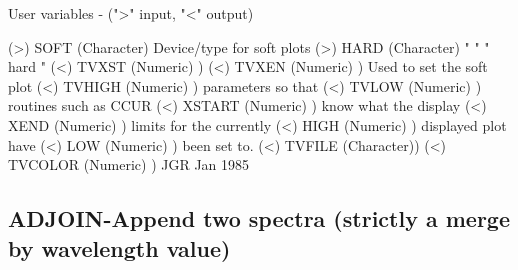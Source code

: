 \begin{description}
 User variables -  (">" input, "<" output)

 (>) SOFT    (Character) Device/type for soft plots
 (>) HARD    (Character)   "     "    "  hard  "
 (<) TVXST   (Numeric)  )
 (<) TVXEN   (Numeric)  ) Used to set the soft plot
 (<) TVHIGH  (Numeric)  ) parameters so that
 (<) TVLOW   (Numeric)  ) routines such as CCUR
 (<) XSTART  (Numeric)  ) know what the display
 (<) XEND    (Numeric)  ) limits for the currently
 (<) HIGH    (Numeric)  ) displayed plot have
 (<) LOW     (Numeric)  ) been set to.
 (<) TVFILE  (Character))
 (<) TVCOLOR (Numeric)  )
                                                JGR   Jan 1985
\end{description}
\subsection{ADJOIN-\label{ADJOIN}Append two spectra (strictly a merge by wavelength value)}
